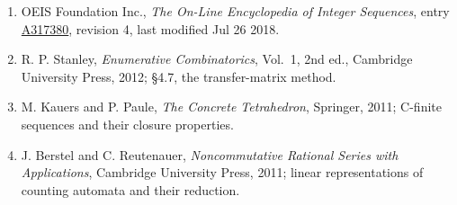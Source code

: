 \documentclass[11pt]{article}
\theoremstyle{definition}
\begin{document}
\begin{enumerate}

\item OEIS Foundation Inc., \emph{The On-Line Encyclopedia of Integer Sequences}, entry \href{https://oeis.org/A317380}{A317380}, revision 4, last modified Jul 26 2018.

\item R. P. Stanley, \emph{Enumerative Combinatorics}, Vol.~1, 2nd ed., Cambridge University Press, 2012; \S4.7, the transfer-matrix method.

\item M. Kauers and P. Paule, \emph{The Concrete Tetrahedron}, Springer, 2011; C-finite sequences and their closure properties.

\item J. Berstel and C. Reutenauer, \emph{Noncommutative Rational Series with Applications}, Cambridge University Press, 2011; linear representations of counting automata and their reduction.

\end{enumerate}
\end{document}
